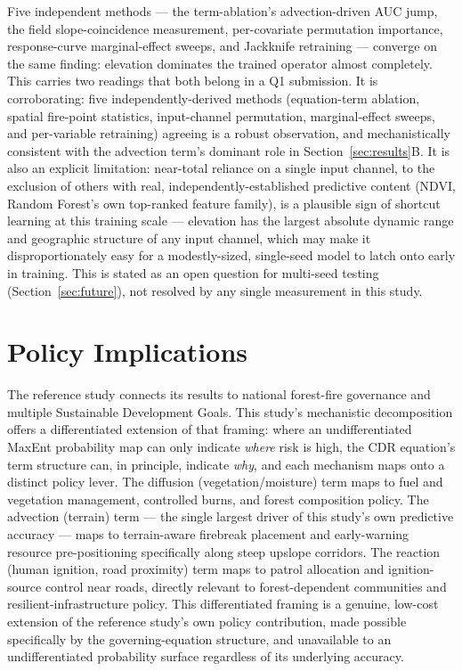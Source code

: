 \documentclass[journal]{IEEEtran}
\begin{document}
Five independent methods --- the term-ablation's advection-driven AUC jump, the field slope-coincidence measurement, per-covariate permutation importance, response-curve marginal-effect sweeps, and Jackknife retraining --- converge on the same finding: elevation dominates the trained operator almost completely. This carries two readings that both belong in a Q1 submission. It is corroborating: five independently-derived methods (equation-term ablation, spatial fire-point statistics, input-channel permutation, marginal-effect sweeps, and per-variable retraining) agreeing is a robust observation, and mechanistically consistent with the advection term's dominant role in Section~\ref{sec:results}B. It is also an explicit limitation: near-total reliance on a single input channel, to the exclusion of others with real, independently-established predictive content (NDVI, Random Forest's own top-ranked feature family), is a plausible sign of shortcut learning at this training scale --- elevation has the largest absolute dynamic range and geographic structure of any input channel, which may make it disproportionately easy for a modestly-sized, single-seed model to latch onto early in training. This is stated as an open question for multi-seed testing (Section~\ref{sec:future}), not resolved by any single measurement in this study.

\section{Policy Implications}

The reference study connects its results to national forest-fire governance and multiple Sustainable Development Goals. This study's mechanistic decomposition offers a differentiated extension of that framing: where an undifferentiated MaxEnt probability map can only indicate \emph{where} risk is high, the CDR equation's term structure can, in principle, indicate \emph{why}, and each mechanism maps onto a distinct policy lever. The diffusion (vegetation/moisture) term maps to fuel and vegetation management, controlled burns, and forest composition policy. The advection (terrain) term --- the single largest driver of this study's own predictive accuracy --- maps to terrain-aware firebreak placement and early-warning resource pre-positioning specifically along steep upslope corridors. The reaction (human ignition, road proximity) term maps to patrol allocation and ignition-source control near roads, directly relevant to forest-dependent communities and resilient-infrastructure policy. This differentiated framing is a genuine, low-cost extension of the reference study's own policy contribution, made possible specifically by the governing-equation structure, and unavailable to an undifferentiated probability surface regardless of its underlying accuracy.
\end{document}
